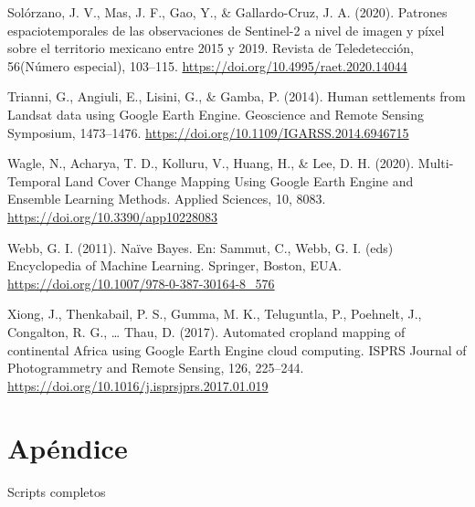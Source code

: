 \documentclass[
  12pt,
  letterpaper,
  twoside]{book}
\begin{document}
Solórzano, J. V., Mas, J. F., Gao, Y., \& Gallardo-Cruz, J. A. (2020). Patrones espaciotemporales de las observaciones de Sentinel-2 a nivel de imagen y píxel sobre el territorio mexicano entre 2015 y 2019. Revista de Teledetección, 56(Número especial), 103--115. \url{https://doi.org/10.4995/raet.2020.14044}

Trianni, G., Angiuli, E., Lisini, G., \& Gamba, P. (2014). Human settlements from Landsat data using Google Earth Engine. Geoscience and Remote Sensing Symposium, 1473--1476. \url{https://doi.org/10.1109/IGARSS.2014.6946715}

Wagle, N., Acharya, T. D., Kolluru, V., Huang, H., \& Lee, D. H. (2020). Multi-Temporal Land Cover Change Mapping Using Google Earth Engine and Ensemble Learning Methods. Applied Sciences, 10, 8083. \url{https://doi.org/10.3390/app10228083}

Webb, G. I. (2011). Naïve Bayes. En: Sammut, C., Webb, G. I. (eds) Encyclopedia of Machine Learning. Springer, Boston, EUA. \url{https://doi.org/10.1007/978-0-387-30164-8_576}

Xiong, J., Thenkabail, P. S., Gumma, M. K., Teluguntla, P., Poehnelt, J., Congalton, R. G., \ldots{} Thau, D. (2017). Automated cropland mapping of continental Africa using Google Earth Engine cloud computing. ISPRS Journal of Photogrammetry and Remote Sensing, 126, 225--244. \url{https://doi.org/10.1016/j.isprsjprs.2017.01.019}

\newpage

\hypertarget{apuxe9ndice}{%
\chapter{Apéndice}\label{apuxe9ndice}}

Scripts completos
\end{document}
